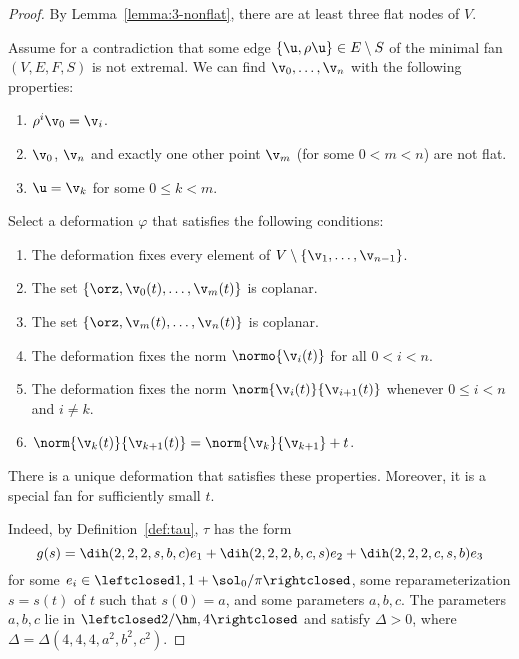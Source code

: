 \begin{proof} 
By Lemma~\ref{lemma:3-nonflat}, there are at least three flat
nodes of $V$.

Assume for a contradiction that some edge $\{\u,\rho\u\}\in
E\setminus S$ of the minimal fan $(V,E,F,S)$ is not extremal.  
We can find $\v_0,\ldots,\v_n$ with the following properties:
\begin{enumerate}\wasitemize 
\item $\rho^i\v_0 =\v_i$.
\item $\v_0$, $\v_n$ and exactly one other point $\v_m$ (for some
  $0<m<n$) are not flat.
\item $\u=\v_k$ for some $0\le k<m$.
\end{enumerate}\wasitemize 

Select a deformation $\varphi$ that satisfies the following conditions:
\begin{enumerate}\wasitemize 
\item The deformation fixes every element of
$V\setminus\{\v_1,\ldots,\v_{n-1}\}$.
\item The set $\{\orz,\v_0(t),\ldots,\v_m(t)\}$ is coplanar.
\item The set $\{\orz,\v_m(t),\ldots,\v_n(t)\}$ is coplanar.
\item The deformation  fixes the norm $\normo{\v_i(t)}$ for all $0<i<n$.
\item The deformation fixes the norm $\norm{\v_i(t)}{\v_{i+1}(t)}$
  whenever $0\le i<n$ and $i\ne k$.
\item $\norm{\v_k(t)}{\v_{k+1}(t)} = \norm{\v_k}{\v_{k+1}}+t$.
\end{enumerate}\wasitemize 
There is a unique deformation that satisfies these properties.  Moreover, it
is a special fan for sufficiently small $t$.

  Indeed, by Definition~\ref{def:tau},
$\tau$ has the form
\[ 
  g(s) = \dih(2,2,2,s,b,c) e_1 
+ \dih(2,2,2,b,c,s) e_2 + \dih(2,2,2,c,s,b) e_3
\] 
for some $e_i\in\leftclosed1,1+\sol_0/\pi\rightclosed$, some
reparameterization $s=s(t)$ of $t$ such that $s(0)=a$, and some
parameters $a,b,c$.  The parameters $a,b,c$ lie in
$\leftclosed2/\hm,4\rightclosed$ and satisfy $\Delta>0$, where
$\Delta = \Delta(4,4,4,a^2,b^2,c^2)$.  


\end{proof}
